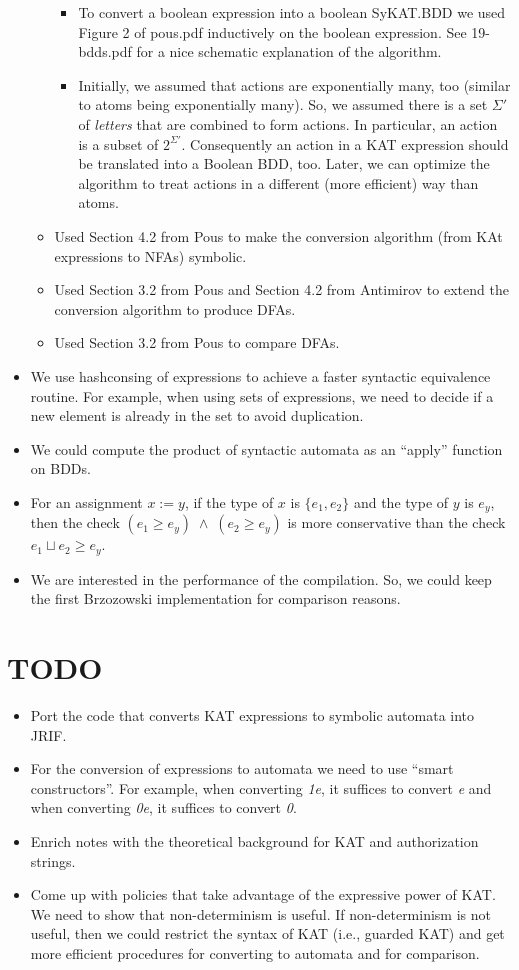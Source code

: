 \documentclass[10pt]{article}
\begin{document}
\begin{itemize}
\begin{itemize}
\begin{itemize}
\item To convert a boolean expression into a boolean SyKAT.BDD we used Figure 2 of pous.pdf inductively on the boolean expression. See 19-bdds.pdf for a nice schematic explanation of the algorithm.
\item Initially, we assumed that actions are exponentially many, too (similar to atoms being exponentially many). So, we assumed there is a set $\Sigma'$ of \emph{letters} that are combined to form actions. In particular, an action is a subset of $2^{\Sigma'}$. Consequently an action in a KAT expression should be translated into a  Boolean BDD, too.  Later, we can optimize the algorithm to treat actions in a different (more efficient) way than atoms.
\end{itemize}
\item Used Section 4.2 from Pous to make the conversion algorithm (from KAt expressions to NFAs) symbolic.
\item Used Section 3.2 from Pous and Section 4.2 from Antimirov to extend the conversion algorithm to produce DFAs.
\item Used Section 3.2 from Pous to compare DFAs.
\end{itemize}
\item We use hashconsing of expressions to achieve a faster syntactic equivalence routine. For example, when using sets of expressions, we need to decide if a new element is already in the set to avoid duplication.
\item We could compute the product of syntactic automata as an ``apply'' function on BDDs.
\item For an assignment $x:=y$, if the type of $x$ is $\{e_1,e_2\}$ and the type of $y$ is $e_y$, then the check $(e_1\geq e_y)\;\wedge\;(e_2\geq e_y)$ is more conservative than the check $e_1\sqcup e_2\geq e_y$.
\item We are interested in the performance of the compilation. So, we could keep the first Brzozowski implementation for comparison reasons.
\end{itemize}

\section*{TODO}
\begin{itemize}
\item Port the code that converts KAT expressions to symbolic automata into JRIF.
\item For the conversion of expressions to automata we need to use ``smart constructors''. For example, when converting \emph{1e}, it suffices to convert \emph{e} and when converting \emph{0e}, it suffices to convert \emph{0}.
\item Enrich notes with the theoretical background for KAT and authorization strings.
\item Come up with policies that take advantage of the expressive power of KAT. We need to show that non-determinism is useful. If non-determinism is not useful, then we could restrict the syntax of KAT (i.e., guarded KAT) and get more efficient procedures for converting to automata and for comparison.
\end{itemize}
\end{document}
